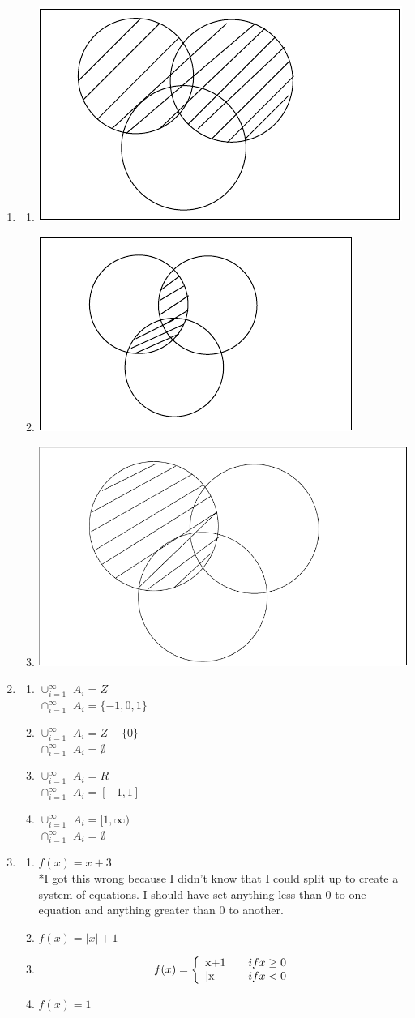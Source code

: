 \documentclass{article}
\begin{document}
\begin{enumerate}
\item
 \begin{enumerate}
 \item
  \includegraphics[width = .3 \textwidth] {Q11A}
 \item
  \includegraphics[width = .3 \textwidth] {Q11B}
 \item
  \includegraphics[width = .3 \textwidth] {Q11C}
 \end{enumerate}

\item
 \begin{enumerate}
 \item $\cup _{i=1}^{\infty}$ $A_i = Z$ \\
       $\cap _{i=1}^{\infty}$ $A_i = \{-1,0,1\}$ 
 \item $\cup _{i=1}^{\infty}$ $A_i = Z - \{0\}$ \\
       $\cap _{i=1}^{\infty}$ $A_i = \emptyset$ 
 \item $\cup _{i=1}^{\infty}$ $A_i = R$ \\
       $\cap _{i=1}^{\infty}$ $A_i = [-1,1]$ 
 \item $\cup _{i=1}^{\infty}$ $A_i = [1,\infty)$ \\
       $\cap _{i=1}^{\infty}$ $A_i = \emptyset$ 
 \end{enumerate} 

\item
 \begin{enumerate}
 \item $f(x) = x+3$ \\
       *I got this wrong because I didn't know that I could split up to create a system of equations.  I should have set anything less than 0 to one equation and anything greater than 0 to another.
 \item $f(x)=|x|+1$
 \item
  \[
	f(x) = \left\{
	\begin{array}{l l}
	$x+1$ & \quad if x \geq 0 \\
	$|x|$ & \quad if x < 0
	\end{array} \right.
  \]
 \item $f(x) = 1$
 \end{enumerate}


\end{enumerate}
\end{document}
